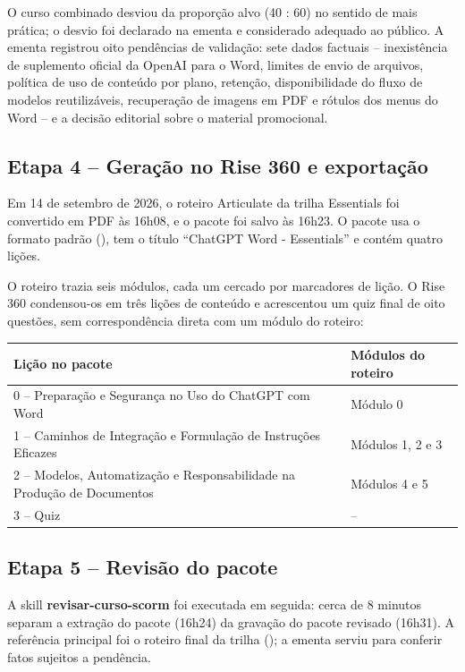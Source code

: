 \documentclass[12pt,a4paper]{article}
\newcommand{\skill}[1]{\textsf{\textbf{#1}}}
\begin{document}
O curso combinado desviou da proporção alvo (40 : 60) no sentido de mais prática; o desvio foi declarado na ementa e considerado adequado ao público. A ementa registrou oito pendências de validação: sete dados factuais -- inexistência de suplemento oficial da OpenAI para o Word, limites de envio de arquivos, política de uso de conteúdo por plano, retenção, disponibilidade do fluxo de modelos reutilizáveis, recuperação de imagens em PDF e rótulos dos menus do Word -- e a decisão editorial sobre o material promocional.

\subsection{Etapa 4 -- Geração no Rise 360 e exportação}

Em 14 de setembro de 2026, o roteiro Articulate da trilha Essentials foi convertido em PDF às 16h08, e o pacote  foi salvo às 16h23. O pacote usa o formato padrão (), tem o título ``ChatGPT Word - Essentials'' e contém quatro lições.

O roteiro trazia seis módulos, cada um cercado por marcadores de lição. O Rise 360 condensou-os em três lições de conteúdo e acrescentou um quiz final de oito questões, sem correspondência direta com um módulo do roteiro:

\begingroup\small
\renewcommand{\arraystretch}{1.3}
\begin{longtable}{@{}L{0.66\textwidth}L{0.28\textwidth}@{}}
\toprule
\textbf{Lição no pacote} & \textbf{Módulos do roteiro} \\
\midrule
{} -- Preparação e Segurança no Uso do ChatGPT com Word & Módulo 0 \\
1 -- Caminhos de Integração e Formulação de Instruções Eficazes & Módulos 1, 2 e 3 \\
2 -- Modelos, Automatização e Responsabilidade na Produção de Documentos & Módulos 4 e 5 \\
3 -- Quiz & -- \\
\bottomrule
\end{longtable}
\endgroup

\subsection{Etapa 5 -- Revisão do pacote}

A skill \skill{revisar-curso-scorm} foi executada em seguida: cerca de 8 minutos separam a extração do pacote (16h24) da gravação do pacote revisado (16h31). A referência principal foi o roteiro final da trilha (); a ementa serviu para conferir fatos sujeitos a pendência.
\end{document}
